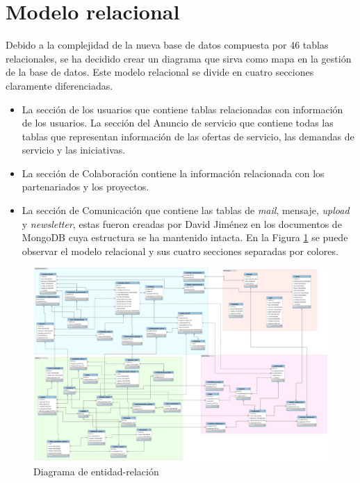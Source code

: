 \documentclass[11pt]{book}
\begin{document}
\section{Modelo relacional}
 Debido a la complejidad de la nueva base de datos compuesta por 46 tablas relacionales, se ha decidido crear un diagrama que sirva como mapa en la gestión de la base de datos. Este modelo relacional se divide en cuatro secciones claramente diferenciadas.
 \begin{itemize} 
 	\item La sección de los usuarios que contiene tablas relacionadas con información de los usuarios. La sección del Anuncio de servicio que contiene todas las tablas que representan información de las ofertas de servicio, las demandas de servicio y las iniciativas.
	\item La sección de Colaboración contiene la información relacionada con los partenariados y los proyectos.
	\item La sección de Comunicación que contiene las tablas de \textit{mail}, mensaje, \textit{upload} y \textit{newsletter}, estas fueron creadas por David Jiménez en los documentos de MongoDB cuya estructura se ha mantenido intacta.
	En la Figura \ref{fig:relacional} se puede observar el modelo relacional y sus cuatro secciones separadas por colores.
\end{itemize}
\begin{landscape}
	\begin{figure}[p]
		\centering
		\includegraphics[scale=0.27]{er}
		\caption{Diagrama de entidad-relación}
		\label{fig:relacional}
	\end{figure}
\end{landscape}
\end{document}
